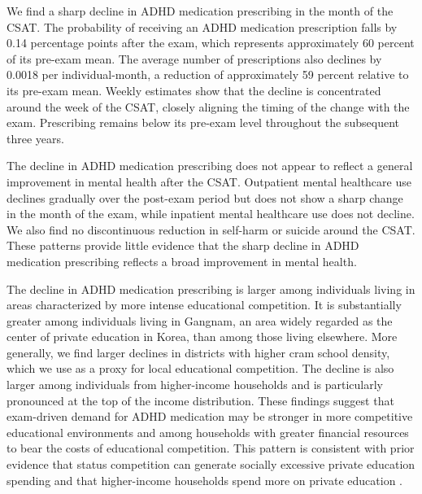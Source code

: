 \documentclass[12pt]{article}
\begin{document}
We find a sharp decline in ADHD medication prescribing in the month of the CSAT. The probability of receiving an ADHD medication prescription falls by 0.14 percentage points after the exam, which represents approximately 60 percent of its pre-exam mean. The average number of prescriptions also declines by 0.0018 per individual-month, a reduction of approximately 59 percent relative to its pre-exam mean. Weekly estimates show that the decline is concentrated around the week of the CSAT, closely aligning the timing of the change with the exam. Prescribing remains below its pre-exam level throughout the subsequent three years.

The decline in ADHD medication prescribing does not appear to reflect a general improvement in mental health after the CSAT. Outpatient mental healthcare use declines gradually over the post-exam period but does not show a sharp change in the month of the exam, while inpatient mental healthcare use does not decline. We also find no discontinuous reduction in self-harm or suicide around the CSAT. These patterns provide little evidence that the sharp decline in ADHD medication prescribing reflects a broad improvement in mental health.

The decline in ADHD medication prescribing is larger among individuals living in areas characterized by more intense educational competition. It is substantially greater among individuals living in Gangnam, an area widely regarded as the center of private education in Korea, than among those living elsewhere. More generally, we find larger declines in districts with higher cram school density, which we use as a proxy for local educational competition. The decline is also larger among individuals from higher-income households and is particularly pronounced at the top of the income distribution. These findings suggest that exam-driven demand for ADHD medication may be stronger in more competitive educational environments and among households with greater financial resources to bear the costs of educational competition. This pattern is consistent with prior evidence that status competition can generate socially excessive private education spending \citep{kim2024} and that higher-income households spend more on private education \citep{kim2010}.
\end{document}
